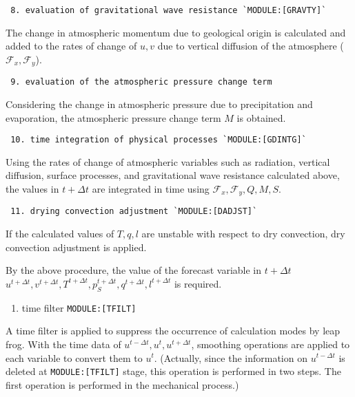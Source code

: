 \begin{verbatim}
 8. evaluation of gravitational wave resistance `MODULE:[GRAVTY]`
\end{verbatim}

The change in atmospheric momentum due to geological origin is
calculated and added to the rates of change of \(u, v\) due to vertical
diffusion of the atmosphere (\({\mathcal F}_x, {\mathcal F}_y\)).

\begin{verbatim}
 9. evaluation of the atmospheric pressure change term
\end{verbatim}

Considering the change in atmospheric pressure due to precipitation and
evaporation, the atmospheric pressure change term \(M\) is obtained.

\begin{verbatim}
 10. time integration of physical processes `MODULE:[GDINTG]`
\end{verbatim}

Using the rates of change of atmospheric variables such as radiation,
vertical diffusion, surface processes, and gravitational wave resistance
calculated above, the values in \(t+\Delta t\) are integrated in time
using \({\mathcal F}_x, {\mathcal F}_y, Q, M, S\).

\begin{verbatim}
 11. drying convection adjustment `MODULE:[DADJST]`
\end{verbatim}

If the calculated values of \(T, q, l\) are unstable with respect to dry
convection, dry convection adjustment is applied.

By the above procedure, the value of the forecast variable in
\(t+\Delta t\)
\(u^{t+\Delta t}, v^{t+\Delta t}, T^{t+\Delta t}, p_S^{t+\Delta t}, q^{t+\Delta t}, l^{t+\Delta t}\)
is required.

\begin{enumerate}
\def\labelenumi{\arabic{enumi}.}
\setcounter{enumi}{5}
\tightlist
\item
  time filter \texttt{MODULE:{[}TFILT{]}}
\end{enumerate}

A time filter is applied to suppress the occurrence of calculation modes
by leap frog. With the time data of
\(u^{t-\Delta t}, u^{t}, u^{t+\Delta t}\), smoothing operations are
applied to each variable to convert them to \(u^{t}\). (Actually, since
the information on \(u^{t-\Delta t}\) is deleted at
\texttt{MODULE:{[}TFILT{]}} stage, this operation is performed in two
steps. The first operation is performed in the mechanical process.)

